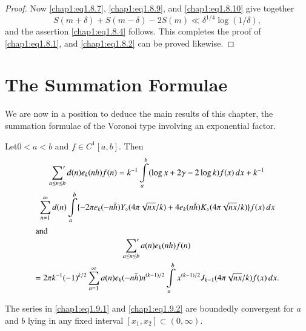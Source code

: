 \begin{proof}
Now \eqref{chap1:eq1.8.7}, \eqref{chap1:eq1.8.9}, and
\eqref{chap1:eq1.8.10} give together
$$
S(m+\delta)+S(m-\delta)-2S(m)\ll \delta^{1/4}\log (1/\delta),
$$
and the assertion \eqref{chap1:eq1.8.4} follows. This completes the
proof of \eqref{chap1:eq1.8.1}, and \eqref{chap1:eq1.8.2} can be
proved likewise.
\end{proof}

\section{The Summation Formulae}\label{chap1:sec1.9} 

We are now in a position to deduce the main results of this chapter,
the summation formulae of the Voronoi type involving an exponential
factor. 

\begin{THM}\label{chap1:thm1.7}
Let\pageoriginale $0<a<b$ and $f\in C^1[a,b]$. Then 
{\fontsize{10}{12}\selectfont
\begin{gather}
\sideset{}{'}\sum\limits_{a\leq n\leq b}d(n)e_k(nh)f(n)=k^{-1}
\int\limits_a^b(\log x+2\gamma-2\log k)f(x)\,dx +k^{-1}\label{chap1:eq1.9.1}\\
\sum\limits_{n=1}^\infty d(n)\int\limits_a^b \{-2\pi
e_k(-n\bar{h})Y_\circ(4\pi\sqrt{nx}/k)+4e_k(n\bar{h})K_\circ
(4\pi\sqrt{nx}/k)\}f(x)\,dx\notag\\
\intertext{and}
\sideset{}{'}\sum\limits_{a\leq n\leq b}a(n)e_k(nh)
f(n)\label{chap1:eq1.9.2}\\
=2\pi k^{-1}(-1)^{k/2}\sum\limits_{n=1}^\infty
a(n)e_k(-n\bar{h})n^{(k-1)/2}\int\limits_a^b x^{(k-1)/2}
J_{k-1}(4\pi\sqrt{nx}/k)f(x)\,dx.\notag
\end{gather}}

The series in \eqref{chap1:eq1.9.1} and \eqref{chap1:eq1.9.2} are
boundedly convergent for $a$ and $b$ lying in any fixed interval
$[x_1,x_2]\subset (0,\infty)$.
\end{THM}

